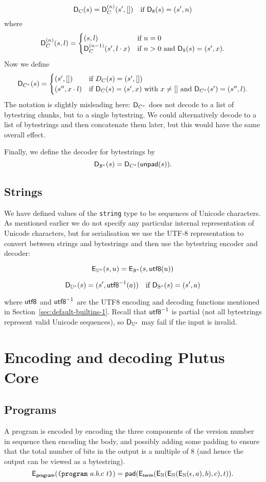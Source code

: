 $$
\mathsf{D}_{C}(s) = \mathsf{D}_C^{(n)}(s',[]) \quad \text{if $\mathsf{D}_8(s) = (s', n)$}
$$
where
$$
\mathsf{D}^{(n)}_C (s, l) =
\begin{cases}
  (s, l) & \text{if $n=0$}\\
  \mathsf{D}^{(n-1)}_C (s',l\cdot x)  & \text{if $n > 0$ and $\mathsf{D}_8(s) = (s',x)$.}
\end{cases}
$$
Now we define
$$
\mathsf{D}_{C^*}(s) =
\begin{cases}
  (s', []) & \text{if $D_C(s) = (s', [])$}\\
  (s'', x \cdot l) & \text{if $\mathsf{D}_C(s) = (s', x)$ with $x \ne []$ and $\mathsf{D}_{C^*}(s') = (s'', l)$}.
\end{cases}
$$
\noindent The notation is slightly misleading here: $\mathsf{D}_{C^*}$ does not
decode to a list of bytestring chunks, but to a single bytestring.  We
could alternatively decode to a list of bytestrings and then concatenate them
later, but this would have the same overall effect.

\medskip
\noindent Finally, we define the decoder for bytestrings by
$$
\mathsf{D}_{\mathbb{B}^*} (s) = \mathsf{D}_{C^*}(\mathsf{unpad}(s)).
$$

\subsection{Strings}
We have defined values of the \texttt{string} type to be sequences of Unicode
characters.  As mentioned earlier we do not specify any particular internal
representation of Unicode characters, but for serialisation we use the UTF-8
representation to convert between strings and bytestrings and then use the
bytestring encoder and decoder:

$$
\mathsf{E}_{\mathbb{U}^*}(s,u) = \mathsf{E}_{\mathbb{B}^*}(s,\mathsf{utf8}(u))
$$

$$
\mathsf{D}_{\mathbb{U}^*}(s) = (s', \mathsf{utf8}^{-1}(a)) \quad \text{if $\mathsf{D}_{\mathbb{B}^*}(s) = (s', a)$}
$$

\noindent
where $\mathsf{utf8}$ and $\mathsf{utf8}^{-1}$ are the UTF8 encoding and decoding functions
mentioned in Section~\ref{sec:default-builtins-1}. Recall that $\mathsf{utf8}^{-1}$
is partial (not all bytestrings represent valid Unicode sequences), so
$\mathsf{D}_{\mathbb{U}^*}$ may fail if the input is invalid.


\section{Encoding and decoding Plutus Core}

\subsection{Programs}
A program is encoded by encoding the three components of the version number in
sequence then encoding the body, and possibly adding some padding to ensure that
the total number of bits in the output is a multiple of 8 (and hence the output
can be viewed as a bytestring).
$$
\mathsf{E}_{\mathsf{program}}(\texttt{(program}\ a.b.c\ t\texttt{)}) =
\mathsf{pad}(\mathsf{E}_{\mathsf{term}}(\mathsf{E}_{\mathbb{N}}(\mathsf{E}_{\mathbb{N}}(\mathsf{E}_{\mathbb{N}}(\epsilon, a), b), c), t)).
$$

